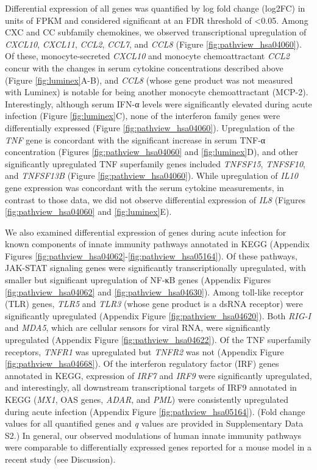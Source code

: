 Differential expression of all genes was quantified by log fold change (log2FC) in units of FPKM and considered significant at an FDR threshold of <0.05. Among CXC and CC subfamily chemokines, we observed transcriptional upregulation of \emph{CXCL10}, \emph{CXCL11}, \emph{CCL2}, \emph{CCL7}, and \emph{CCL8} (Figure \ref{fig:pathview_hsa04060}). Of these, monocyte-secreted \emph{CXCL10} and monocyte chemoattractant \emph{CCL2} concur with the changes in serum cytokine concentrations described above (Figure \ref{fig:luminex}A-B), and \emph{CCL8} (whose gene product was not measured with Luminex) is notable for being another monocyte chemoattractant (MCP-2). Interestingly, although serum IFN-α levels were significantly elevated during acute infection (Figure \ref{fig:luminex}C), none of the interferon family genes were differentially expressed (Figure \ref{fig:pathview_hsa04060}). Upregulation of the \emph{TNF} gene is concordant with the significant increase in serum TNF-α concentration (Figures \ref{fig:pathview_hsa04060} and \ref{fig:luminex}D), and other significantly upregulated TNF superfamily genes included \emph{TNFSF15}, \emph{TNFSF10}, and \emph{TNFSF13B} (Figure \ref{fig:pathview_hsa04060}). While upregulation of \emph{IL10} gene expression was concordant with the serum cytokine measurements, in contrast to those data, we did not observe differential expression of \emph{IL8} (Figures \ref{fig:pathview_hsa04060} and \ref{fig:luminex}E). 

We also examined differential expression of genes during acute infection for known components of innate immunity pathways annotated in KEGG\autocite{Ogata1999} (Appendix Figures \ref{fig:pathview_hsa04062}-\ref{fig:pathview_hsa05164}). Of these pathways, JAK-STAT signaling genes were significantly transcriptionally upregulated, with smaller but significant upregulation of NF-κB genes (Appendix Figures \ref{fig:pathview_hsa04062} and \ref{fig:pathview_hsa04630}). Among toll-like receptor (TLR) genes, \emph{TLR5} and \emph{TLR3} (whose gene product is a dsRNA receptor) were significantly upregulated (Appendix Figure \ref{fig:pathview_hsa04620}). Both \emph{RIG-I} and \emph{MDA5}, which are cellular sensors for viral RNA, were significantly upregulated (Appendix Figure \ref{fig:pathview_hsa04622}). Of the TNF superfamily receptors, \emph{TNFR1} was upregulated but \emph{TNFR2} was not (Appendix Figure \ref{fig:pathview_hsa04668}). Of the interferon regulatory factor (IRF) genes annotated in KEGG, expression of \emph{IRF7} and \emph{IRF9} were significantly upregulated, and interestingly, all downstream transcriptional targets of IRF9 annotated in KEGG (\emph{MX1}, OAS genes, \emph{ADAR}, and \emph{PML}) were consistently upregulated during acute infection (Appendix Figure \ref{fig:pathview_hsa05164}). (Fold change values for all quantified genes and \emph{q} values are provided in Supplementary Data S2.) In general, our observed modulations of human innate immunity pathways were comparable to differentially expressed genes reported for a mouse model in a recent study (see Discussion). 


